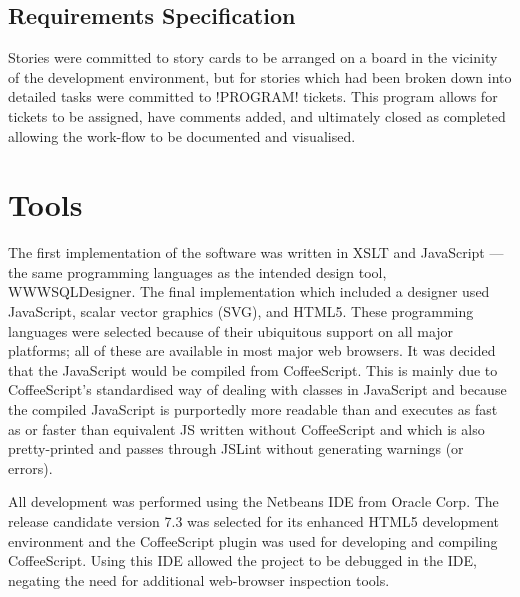 \subsection*{Requirements Specification}
Stories were committed to story cards to be arranged on a board in the vicinity of the development environment, but for stories which had been broken down into detailed tasks were committed to !PROGRAM! tickets. This program allows for tickets to be assigned, have comments added, and ultimately closed as completed allowing the work-flow to be documented and visualised.

\section{Tools}
The first implementation of the software was written in XSLT and JavaScript --- the same programming languages as the intended design tool, \mbox{WWWSQLDesigner}. The final implementation which included a designer used JavaScript, scalar vector graphics (SVG), and HTML5. These programming languages were selected because of their ubiquitous support on all major platforms; all of these are available in most major web browsers. It was decided that the Java\-Script would be compiled from Coffee\-Script. This is mainly due to Coffee\-Script's standardised way of dealing with classes in Java\-Script and because the compiled Java\-Script is purportedly more readable than and executes as fast as or faster than equivalent JS written without Coffee\-Script and which is also pretty-printed and passes through JSLint without generating warnings (or errors).

All development was performed using the Netbeans IDE from Oracle Corp. The release candidate version 7.3 was selected for its enhanced HTML5 development environment and the Coffee\-Script plugin was used for developing and compiling Coffee\-Script. Using this IDE allowed the project to be debugged in the IDE, negating the need for additional web-browser inspection tools.